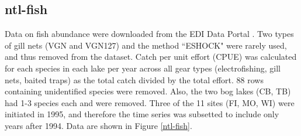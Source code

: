 \documentclass[11pt, oneside]{article}
\begin{document}
\subsection {ntl-fish}

Data on fish abundance were downloaded from the EDI Data Portal \citep{ntl-fish}.
Two types of gill nets (VGN and VGN127) and the method  ``ESHOCK" were rarely used, and thus removed from the dataset.%
Catch per unit effort (CPUE) was calculated for each species in each lake per year across all gear types (electrofishing, gill nets, baited traps) as the total catch divided by the total effort.
88 rows containing unidentified species were removed.
Also, the two bog lakes (CB, TB) had 1-3 species each and were removed. 
Three of the 11 sites (FI, MO, WI) were initiated in 1995, and therefore the time series was subsetted to include only years after 1994.
Data are shown in Figure \ref{ntl-fish}.
\end{document}
